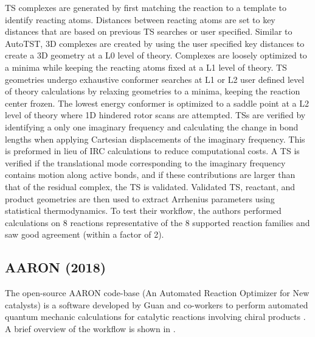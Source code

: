 \documentclass[preprint, 11pt]{elsarticle} %
\begin{document}
TS complexes are generated by first matching the reaction to a template to identify reacting atoms.
Distances between reacting atoms are set to key distances that are based on previous TS searches or user specified.
Similar to AutoTST, 3D complexes are created by using the user specified key distances to create a 3D geometry at a L0 level of theory.
Complexes are loosely optimized to a minima while keeping the reacting atoms fixed at a L1 level of theory.
TS geometries undergo exhaustive conformer searches at L1 or L2 user defined level of theory calculations by relaxing geometries to a minima, keeping the reaction center frozen.
The lowest energy conformer is optimized to a saddle point at a L2 level of theory where 1D hindered rotor scans are attempted. 
TSs are verified by identifying a only one imaginary frequency and calculating the change in bond lengths when applying Cartesian displacements of the imaginary frequency.
This is preformed in lieu of IRC calculations to reduce computational costs.
A TS is verified if the translational mode corresponding to the imaginary frequency contains motion along active bonds, and if these contributions are larger than that of the residual complex, the TS is validated. 
Validated TS, reactant, and product geometries are then used to extract Arrhenius parameters using statistical thermodynamics.
To test their workflow, the authors performed calculations on 8 reactions representative of the 8 supported reaction families and saw good agreement (within a factor of 2).


\subsection{AARON (2018)}

The open-source AARON code-base (An Automated Reaction Optimizer for New catalysts) is a software developed by Guan and co-workers to perform automated quantum mechanic calculations for catalytic reactions involving chiral products \cite{Guan:2018}. 
A brief overview of the workflow is shown in .
\end{document}
